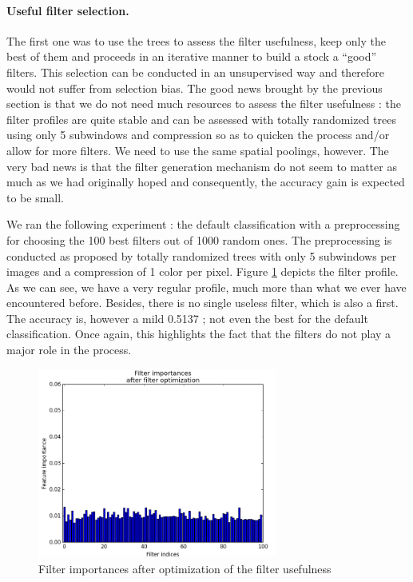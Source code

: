 \documentclass[a4paper]{report}
\begin{document}
	\paragraph{Useful filter selection.}
	The first one was to use the trees to assess the filter usefulness, keep only the best of them and proceeds in an iterative manner to build a stock a ``good'' filters. This selection can be conducted in an unsupervised way and therefore would not suffer from selection bias. The good news brought by the previous section is that we do not need much resources to assess the filter usefulness : the filter profiles are quite stable and can be assessed with totally randomized trees using only 5 subwindows and compression so as to quicken the process and/or allow for more filters. We need to use the same spatial poolings, however. The very bad news is that the filter generation mechanism do not seem to matter as much as we had originally hoped and consequently, the accuracy gain is expected to be small.
	\par
	We ran the following experiment : the default classification with a preprocessing for choosing the 100 best filters out of 1000 random ones. The preprocessing is conducted as proposed by totally randomized trees with only 5 subwindows per images and a compression of 1 color per pixel. 
	Figure \ref{fig:FIOpti} depicts the filter profile. As we can see, we have a very regular profile, much more than what we ever have encountered before. Besides, there is no single useless filter, which is also a first. The accuracy is, however a mild 0.5137 ; not even the best for the default classification.
	Once again, this highlights the fact that the filters do not play a major role in the process.
	
	
	\begin{figure}
		\centering
			\includegraphics[width=0.7\textwidth]{images/FIOpti.png}
		\caption{\label{fig:FIOpti}Filter importances after optimization of the filter usefulness}
	\end{figure}
\end{document}
